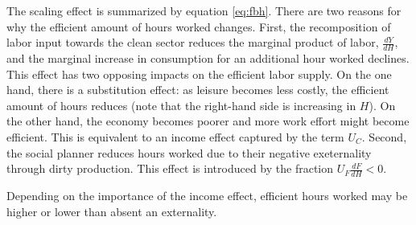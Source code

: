 The scaling effect is summarized by equation \ref{eq:fbh}.
There are two reasons for why the efficient amount of hours worked changes. 
First, the recomposition of labor input towards the  clean sector reduces the marginal product of labor, $\frac{dY}{dH}$, and the marginal increase in consumption for an additional hour worked declines.  This effect has two opposing impacts on the efficient labor supply. On the one hand, there is a substitution effect: as leisure becomes less costly, the efficient amount of hours reduces (note that the right-hand side is increasing in $H$). On the other hand, the economy becomes poorer and more work effort might become efficient. This is equivalent to an income effect captured by the term $U_C$. 
Second, the social planner reduces hours worked due to their negative exeternality through dirty production. This effect is introduced by the fraction $U_F\frac{dF}{dH}<0$. 

Depending on the importance of the income effect, efficient hours worked may be higher or lower than  absent an externality. %

\begin{comment}
\hrule
One can show that the total effect of a drop in the dirty labor share on hours worked is positive, i.e. $\frac{dh_{FB}}{ds}>0$, if $\theta<\frac{\varepsilon}{\varepsilon-s}$. If the income effect dominates, the social planner increases hours worked as the economy becomes less productive. 
Under the value for $\theta$ suggested by \cite{Boppart2019LaborPerspectiveb}, the efficient scale effect is to increase hours worked. When, however, the substitution effect outweighs or dominates the income effect - as commonly assumed in the public finance literature \citep{Heathcote2017OptimalFramework, LansBovenberg1994EnvironmentalTaxation, LansBovenberg1996OptimalAnalyses} \tr{CHECK this}!.
Nevertheless, the level of hours worked exceeds the efficient level irrespective of $\theta$ when no lump-sum transfers are available. 
When the efficient level of hours increases, though, the dirty labor share reduces even more to outweigh the increase in the externality.

content...
\end{comment}

